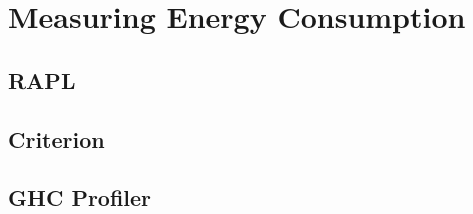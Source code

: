 \chapter{Measuring Energy Consumption}

\section{RAPL}
\lipsum[1-3]


\section{Criterion}
\lipsum[1-4]


\section{GHC Profiler}
\lipsum[1-4]
